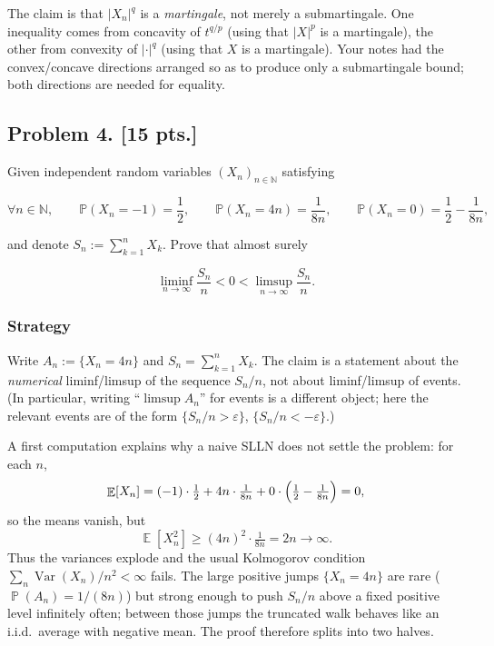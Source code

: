 \documentclass[11pt,a4paper]{article}
\DeclareMathOperator{\Var}{Var}
\DeclareMathOperator{\E}{\mathbb{E}}
\DeclareMathOperator{\Pbb}{\mathbb{P}}
\begin{document}
\begin{remark*}
The claim is that \(|X_n|^q\) is a \emph{martingale}, not merely a submartingale. One inequality comes from concavity of \(t^{q/p}\) (using that \(|X|^p\) is a martingale), the other from convexity of \(|\cdot|^q\) (using that \(X\) is a martingale). Your notes had the convex/concave directions arranged so as to produce only a submartingale bound; both directions are needed for equality.
\end{remark*}

\subsection{Problem 4. [15 pts.]}
Given independent random variables \( (X_n)_{n \in \mathbb{N}} \) satisfying

\[
\forall n \in \mathbb{N}, \qquad
\mathbb{P}(X_n = -1) = \frac{1}{2}, \qquad
\mathbb{P}(X_n = 4n) = \frac{1}{8n}, \qquad
\mathbb{P}(X_n = 0) = \frac{1}{2} - \frac{1}{8n},
\]

and denote \( S_n := \sum_{k=1}^n X_k \). Prove that almost surely

\[
\liminf_{n \to \infty} \frac{S_n}{n} < 0 < \limsup_{n \to \infty} \frac{S_n}{n}.
\]

\setcounter{section}{4}
\setcounter{theorem}{0}
\setcounter{definition}{0}
\setcounter{remark}{0}
\setcounter{note}{0}

\subsubsection{Strategy}

Write \(A_n:=\{X_n=4n\}\) and \(S_n=\sum_{k=1}^n X_k\). The claim is a statement about the \emph{numerical} liminf/limsup of the sequence \(S_n/n\), not about liminf/limsup of events. (In particular, writing ``\(\limsup A_n\)'' for events is a different object; here the relevant events are of the form \(\{S_n/n>\varepsilon\}\), \(\{S_n/n<-\varepsilon\}\).)

A first computation explains why a naive SLLN does not settle the problem: for each \(n\),
\[
\E[X_n]
=
(-1)\cdot\tfrac12
+
4n\cdot\tfrac1{8n}
+
0\cdot\Bigl(\tfrac12-\tfrac1{8n}\Bigr)
=
0,
\]
so the means vanish, but
\[
\E[X_n^2]
\ge
(4n)^2\cdot\tfrac1{8n}
=
2n\to\infty.
\]
Thus the variances explode and the usual Kolmogorov condition \(\sum_n\Var(X_n)/n^2<\infty\) fails. The large positive jumps \(\{X_n=4n\}\) are rare (\(\Pbb(A_n)=1/(8n)\)) but strong enough to push \(S_n/n\) above a fixed positive level infinitely often; between those jumps the truncated walk behaves like an i.i.d.\ average with negative mean. The proof therefore splits into two halves.
\end{document}
